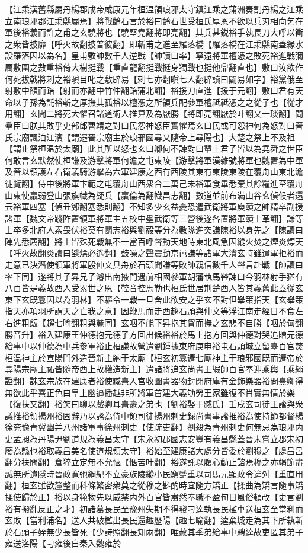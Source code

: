 【江乘漢舊縣屬丹楊郡成帝咸康元年桓温領琅邪太守鎮江乘之蒲洲奏割丹楊之江乘立南琅邪郡江乘縣屬焉】將戰齡石言於裕曰齡石世受桓氏厚恩不欲以兵刃相向乞在軍後裕義而許之甫之玄驍將也【驍堅堯翻將即亮翻】其兵甚鋭裕手執長刀大呼以衝之衆皆披靡【呼火故翻披普彼翻】即斬甫之進至羅落橋【羅落橋在江乘縣南蓋緣水設羅落因以為名】皇甫敷帥數千人逆戰【帥讀曰率】寧遠將軍檀憑之敗死裕進戰彌厲敷圍之數重裕倚大樹挺戰【重直龍翻挺戰挺身獨戰也挺他鼎翻直也】敷曰汝欲作何死拔戟將刺之裕瞋目叱之敷辟易【刺七亦翻瞋七人翻辟讀曰闢易如字】裕黨俄至射敷中額而踣【射而亦翻中竹仲翻踣蒲北翻】裕援刀直進【援于元翻】敷曰君有天命以子孫為託裕斬之厚撫其孤裕以檀憑之所領兵配參軍檀祗祗憑之之從子也【從才用翻】玄聞二將死大懼召諸道術人推算及為厭勝【將即亮翻厭於叶翻又一琰翻】問羣臣曰朕其敗乎吏部郎曹靖之對曰民怨神怒臣實懼焉玄曰民或可怨神何為怒對曰晉氏宗廟飄泊江濱【謂遷晉宗廟主於琅邪國尋又隨帝上尋陽也】大楚之祭上不及祖【謂止祭桓温於太廟】此其所以怒也玄曰卿何不諫對曰輦上君子皆以為堯舜之世臣何敢言玄默然使桓謙及游擊將軍何澹之屯東陵【游擊將軍漢雜號將軍也魏置為中軍及晉以領護左右衛驍騎游擊為六軍建康之西有西陵其東有東陵東陵在覆舟山東北澹徒覽翻】侍中後將軍卞範之屯覆舟山西衆合二萬己未裕軍食畢悉棄其餘糧進至覆舟山東使羸弱登山張旗幟為疑兵【羸倫為翻幟昌志翻】數道並前布滿山谷玄偵候者還云裕軍四塞【偵丑鄭翻塞悉則翻】不知多少玄益憂恐遣武衛將軍庾賾之帥精卒副援諸軍【魏文帝踐阼置領軍將軍主五校中壘武衛等三營後遂各置將軍賾士革翻】謙等士卒多北府人素畏伏裕莫有鬭志裕與劉毅等分為數隊進突謙陳裕以身先之【陳讀曰陣先悉薦翻】將士皆殊死戰無不一當百呼聲動天地時東北風急因縱火焚之煙炎熛天【呼火故翻炎讀曰燄熛必遙翻】鼓噪之聲震動京邑謙等諸軍大潰玄時雖遣軍拒裕而走意已決潛使領軍將軍殷仲文具舟於石頭聞謙等敗帥親信數千人聲言赴戰【帥讀曰率下同】遂將其子昇兄子濬出南掖門遇前相國參軍胡藩執馬鞚諫曰今羽林射手猶有八百皆是義故西人受累世之恩【鞚音控馬勒也桓氏世居荆楚西人皆其義舊此蓋從玄東下玄既簒因以為羽林】不驅令一戰一旦舍此欲安之乎玄不對但舉策指天【玄舉策指天亦項羽所謂天之亡我之意】因鞭馬而走西趨石頭與仲文等浮江南走經日不食左右進粗飯【趨七喻翻粗與麄同】玄咽不能下昇抱其胷而撫之玄悲不自勝【咽於甸翻勝音升】裕入建康王仲德抱元德子方回出候裕裕於馬上抱方回與仲德對哭追贈元德給事中以仲德為中兵參軍裕止桓謙故營遣劉鍾據東府庚申裕屯石頭城立留臺百官焚桓温神主於宣陽門外造晉新主納于太廟【桓玄初簒遷七廟神主于琅邪國既而遷帝於尋陽宗廟主祏皆隨帝西上故權造新主】遣諸將追玄尚書王嘏帥百官奉迎乘輿【乘繩證翻】誅玄宗族在建康者裕使臧熹入宫收圖書器物封閉府庫有金飾樂器裕問熹卿得無欲此乎熹正色曰皇上幽逼播越非所將軍首建大義劬勞王家雖復不肖實無情於樂【復扶又翻】裕笑曰聊以戲卿耳熹燾之弟也【劉裕娶于臧氏】壬戌玄司徒王謐與衆議推裕領揚州裕固辭乃以謐為侍中領司徒揚州刺史録尚書事謐推裕為使持節都督楊徐兖豫青冀幽并八州諸軍事徐州刺史【使疏吏翻】劉毅為青州刺史何無忌為琅邪内史孟昶為丹陽尹劉道規為義昌太守【宋永初郡國志安豐有義昌縣蓋晉末嘗立郡宋初廢為縣也裕取義昌美名使道規領太守】裕始至建康諸大處分皆委於劉穆之【處昌呂翻分扶問翻】倉猝立定無不允愜【愜苦叶翻】裕遂託以腹心動止諮焉穆之亦竭節盡誠無所遺隱時晉政寛弛綱紀不立豪族陵縱小民窮蹙重以司馬元顯政令違舛【重直用翻】桓玄雖欲釐整而科條繁密衆莫之從穆之斟酌時宜隨方矯正【揉曲為矯言隨事矯揉使歸於正】裕以身範物先以威禁内外百官皆肅然奉職不盈旬日風俗頓改【史言劉裕有撥亂反正之才】初諸葛長民至豫州失期不得發刁逵執長民檻車送桓玄至當利而玄敗【當利浦名】送人共破檻出長民還趣歷陽【趣七喻翻】逵棄城走為其下所執斬於石頭子姪無少長皆死【少詩照翻長知兩翻】唯赦其季弟給事中騁逵故吏匿其弟子雍送洛陽【刁雍後自秦入魏雍於